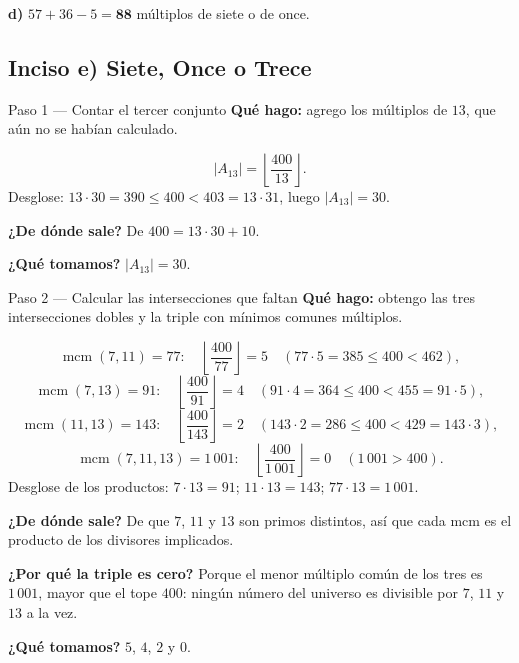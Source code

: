 \documentclass[11pt]{article}
\begin{document}
\begin{resp}
\textbf{d)} $57+36-5 = \mathbf{88}$ múltiplos de siete o de once.
\end{resp}

\subsection*{Inciso e) Siete, Once o Trece}

\begin{paso}{Paso 1 --- Contar el tercer conjunto}
\textbf{Qué hago:} agrego los múltiplos de $13$, que aún no se habían calculado.

\[
|A_{13}| = \left\lfloor \frac{400}{13}\right\rfloor .
\]
Desglose: $13\cdot 30 = 390\le 400 < 403 = 13\cdot 31$, luego $|A_{13}|=30$.

\textbf{¿De dónde sale?} De $400 = 13\cdot 30 + 10$.

\textbf{¿Qué tomamos?} $|A_{13}|=30$.
\end{paso}

\begin{paso}{Paso 2 --- Calcular las intersecciones que faltan}
\textbf{Qué hago:} obtengo las tres intersecciones dobles y la triple con mínimos comunes múltiplos.

\[
\operatorname{mcm}(7,11) = 77:\quad \left\lfloor \frac{400}{77}\right\rfloor = 5 \quad (77\cdot 5 = 385\le 400<462),
\]
\[
\operatorname{mcm}(7,13) = 91:\quad \left\lfloor \frac{400}{91}\right\rfloor = 4 \quad (91\cdot 4 = 364\le 400 < 455 = 91\cdot 5),
\]
\[
\operatorname{mcm}(11,13) = 143:\quad \left\lfloor \frac{400}{143}\right\rfloor = 2 \quad (143\cdot 2 = 286\le 400 < 429 = 143\cdot 3),
\]
\[
\operatorname{mcm}(7,11,13) = 1\,001:\quad \left\lfloor \frac{400}{1\,001}\right\rfloor = 0 \quad (1\,001 > 400).
\]
Desglose de los productos: $7\cdot 13 = 91$; $11\cdot 13 = 143$; $77\cdot 13 = 1\,001$.

\textbf{¿De dónde sale?} De que $7$, $11$ y $13$ son primos distintos, así que cada mcm es el producto de los divisores implicados.

\textbf{¿Por qué la triple es cero?} Porque el menor múltiplo común de los tres es $1\,001$, mayor que el tope $400$: ningún número del universo es divisible por $7$, $11$ y $13$ a la vez.

\textbf{¿Qué tomamos?} $5$, $4$, $2$ y $0$.
\end{paso}
\end{document}
